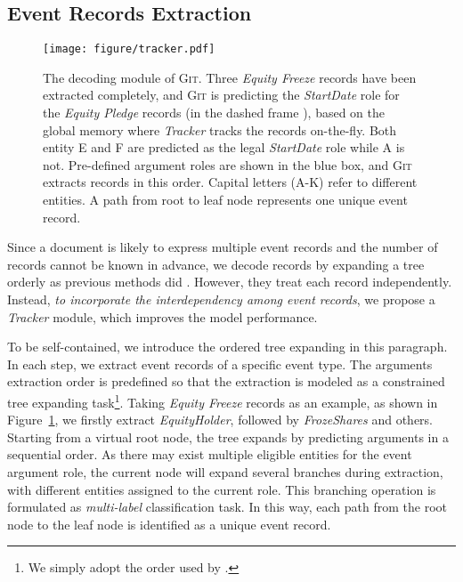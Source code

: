 \documentclass[11pt,a4paper]{article}
\newcommand{\modelname}{\textsc{Git}\xspace}
\newcommand\dboxed[1]{\dbox{\strut{#1}}}
\begin{document}
\subsection{Event Records Extraction}
\label{sec:records_extraction}
\begin{figure}[t]
    \centering
    \texttt{[image: figure/tracker.pdf]}
    \caption{The decoding module of \modelname.
    Three \textit{Equity Freeze} records have been extracted completely, and \modelname is predicting the \textit{StartDate} role for the \textit{Equity Pledge} records (in the dashed frame \dboxed{} ), based on the global memory where \textit{Tracker} tracks the records on-the-fly. 
    Both entity E and F are predicted as the legal \textit{StartDate} role while A is not.
    Pre-defined argument roles are shown in the blue box, and \modelname extracts records in this order.
    Capital letters (A-K) refer to different entities. 
    A path from root to leaf node represents one unique event record.
    }
    \label{fig:tracker}
\end{figure}

Since a document is likely to express multiple event records and the number of records cannot be known in advance, we decode records by  expanding a tree orderly as previous methods did \citep{zheng-etal-2019-doc2edag}. 
However, they treat each record independently.
Instead, \emph{to incorporate the interdependency among event records}, we propose a \textit{Tracker} module, which improves the model performance.

To be self-contained, we introduce the ordered tree expanding in this paragraph.
In each step, we extract event records of a specific event type. 
The arguments extraction order is predefined so that the extraction is modeled as a constrained tree expanding task\footnote{We simply adopt the order used by \citet{zheng-etal-2019-doc2edag}.}.
Taking \textit{Equity Freeze} records as an example, as shown in Figure~\ref{fig:tracker}, we firstly extract \textit{EquityHolder}, followed by \textit{FrozeShares} and others.
Starting from a virtual root node, the tree expands by predicting arguments in a sequential order. 
As there may exist multiple eligible entities for the event argument role, the current node will expand several branches during extraction, with different entities assigned to the current role.
This branching operation is formulated as \emph{multi-label} classification task.
In this way, each path from the root node to the leaf node is identified as a unique event record.
\end{document}
